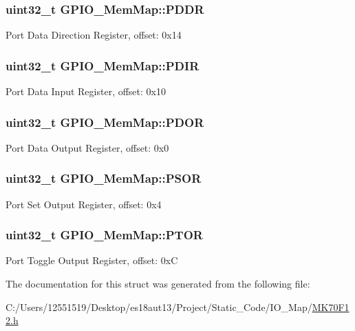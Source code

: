 \subsubsection[{P\+D\+D\+R}]{\setlength{\rightskip}{0pt plus 5cm}uint32\+\_\+t G\+P\+I\+O\+\_\+\+Mem\+Map\+::\+P\+D\+D\+R}\label{struct_g_p_i_o___mem_map_a49dfaa95d08fa9178dd7f098c87f562d}
Port Data Direction Register, offset\+: 0x14 \hypertarget{struct_g_p_i_o___mem_map_a01933bea5d005bf126ea2e0345518763}{}
\subsubsection[{P\+D\+I\+R}]{\setlength{\rightskip}{0pt plus 5cm}uint32\+\_\+t G\+P\+I\+O\+\_\+\+Mem\+Map\+::\+P\+D\+I\+R}\label{struct_g_p_i_o___mem_map_a01933bea5d005bf126ea2e0345518763}
Port Data Input Register, offset\+: 0x10 \hypertarget{struct_g_p_i_o___mem_map_aaf4f486952b9b4680e270ce6266122fd}{}
\subsubsection[{P\+D\+O\+R}]{\setlength{\rightskip}{0pt plus 5cm}uint32\+\_\+t G\+P\+I\+O\+\_\+\+Mem\+Map\+::\+P\+D\+O\+R}\label{struct_g_p_i_o___mem_map_aaf4f486952b9b4680e270ce6266122fd}
Port Data Output Register, offset\+: 0x0 \hypertarget{struct_g_p_i_o___mem_map_a14833f065ec123137ccce5ab873b5879}{}
\subsubsection[{P\+S\+O\+R}]{\setlength{\rightskip}{0pt plus 5cm}uint32\+\_\+t G\+P\+I\+O\+\_\+\+Mem\+Map\+::\+P\+S\+O\+R}\label{struct_g_p_i_o___mem_map_a14833f065ec123137ccce5ab873b5879}
Port Set Output Register, offset\+: 0x4 \hypertarget{struct_g_p_i_o___mem_map_a03faa882b5f4554ff4c11954c2d8759b}{}
\subsubsection[{P\+T\+O\+R}]{\setlength{\rightskip}{0pt plus 5cm}uint32\+\_\+t G\+P\+I\+O\+\_\+\+Mem\+Map\+::\+P\+T\+O\+R}\label{struct_g_p_i_o___mem_map_a03faa882b5f4554ff4c11954c2d8759b}
Port Toggle Output Register, offset\+: 0x\+C 

The documentation for this struct was generated from the following file\+:\begin{DoxyCompactItemize}
\item 
C\+:/\+Users/12551519/\+Desktop/es18aut13/\+Project/\+Static\+\_\+\+Code/\+I\+O\+\_\+\+Map/\hyperlink{_m_k70_f12_8h}{M\+K70\+F12.\+h}\end{DoxyCompactItemize}
